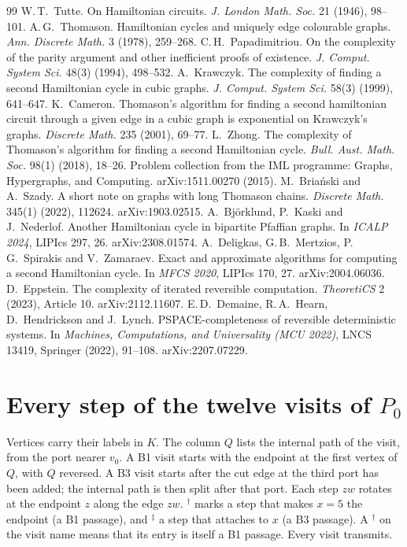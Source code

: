\documentclass[11pt]{article}
\theoremstyle{definition}
\begin{document}
\begin{thebibliography}{99}
 W.\,T.~Tutte. On Hamiltonian circuits. \emph{J. London Math. Soc.} 21 (1946),
98--101.
 A.\,G.~Thomason. Hamiltonian cycles and uniquely edge colourable graphs.
\emph{Ann. Discrete Math.} 3 (1978), 259--268.
 C.\,H.~Papadimitriou. On the complexity of the parity argument and other
inefficient proofs of existence. \emph{J. Comput. System Sci.} 48(3) (1994), 498--532.
 A.~Krawczyk. The complexity of finding a second Hamiltonian cycle in cubic
graphs. \emph{J. Comput. System Sci.} 58(3) (1999), 641--647.
 K.~Cameron. Thomason's algorithm for finding a second hamiltonian circuit
through a given edge in a cubic graph is exponential on Krawczyk's graphs. \emph{Discrete Math.}
235 (2001), 69--77.
 L.~Zhong. The complexity of Thomason's algorithm for finding a second Hamiltonian
cycle. \emph{Bull. Aust. Math. Soc.} 98(1) (2018), 18--26.
 Problem collection from the IML programme: Graphs, Hypergraphs, and Computing.
arXiv:1511.00270 (2015).
 M.~Bria\'nski and A.~Szady. A short note on graphs with long Thomason
chains. \emph{Discrete Math.} 345(1) (2022), 112624. arXiv:1903.02515.
 A.~Bj\"orklund, P.~Kaski and J.~Nederlof. Another Hamiltonian cycle in bipartite
Pfaffian graphs. In \emph{ICALP 2024}, LIPIcs 297, 26. arXiv:2308.01574.
 A.~Deligkas, G.\,B.~Mertzios, P.\,G.~Spirakis and V.~Zamaraev. Exact and
approximate algorithms for computing a second Hamiltonian cycle. In \emph{MFCS 2020}, LIPIcs 170,
27. arXiv:2004.06036.
 D.~Eppstein. The complexity of iterated reversible computation.
\emph{TheoretiCS} 2 (2023), Article 10. arXiv:2112.11607.
 E.\,D.~Demaine, R.\,A.~Hearn, D.~Hendrickson and J.~Lynch. PSPACE-completeness of
reversible deterministic systems. In \emph{Machines, Computations, and Universality (MCU 2022)},
LNCS 13419, Springer (2022), 91--108. arXiv:2207.07229.
\end{thebibliography}

\appendix
\section{Every step of the twelve visits of \texorpdfstring{$P_0$}{P0}}\label{app:visits}

Vertices carry their labels in $K$. The column $Q$ lists the internal path of the visit, from the
port nearer $v_0$. A B1 visit starts with the endpoint at the first vertex of $Q$, with $Q$
reversed. A B3 visit starts after the cut edge at the third port has been added; the internal path
is then split after that port. Each step $zw$ rotates at the endpoint $z$ along the edge $zw$.
${}^{\dagger}$ marks a step that makes $x = 5$ the endpoint (a B1 passage), and ${}^{\ddagger}$ a
step that attaches to $x$ (a B3 passage). A ${}^{\dagger}$ on the visit name means that its entry
is itself a B1 passage. Every visit transmits.
\end{document}
